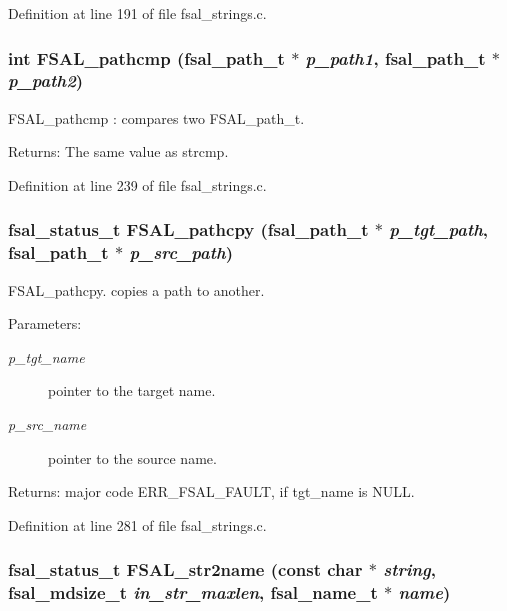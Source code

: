 Definition at line 191 of file fsal\_\-strings.c.
\subsubsection{\setlength{\rightskip}{0pt plus 5cm}int FSAL\_\-pathcmp (fsal\_\-path\_\-t $\ast$ {\em p\_\-path1}, fsal\_\-path\_\-t $\ast$ {\em p\_\-path2})}\label{group__FSALNameFunctions_ga5}


FSAL\_\-pathcmp : compares two FSAL\_\-path\_\-t.

\begin{Desc}
\item[Returns:]The same value as strcmp. \end{Desc}


Definition at line 239 of file fsal\_\-strings.c.
\subsubsection{\setlength{\rightskip}{0pt plus 5cm}fsal\_\-status\_\-t FSAL\_\-pathcpy (fsal\_\-path\_\-t $\ast$ {\em p\_\-tgt\_\-path}, fsal\_\-path\_\-t $\ast$ {\em p\_\-src\_\-path})}\label{group__FSALNameFunctions_ga7}


FSAL\_\-pathcpy. copies a path to another.

\begin{Desc}
\item[Parameters:]
\begin{description}
\item[{\em p\_\-tgt\_\-name}]pointer to the target name. \item[{\em p\_\-src\_\-name}]pointer to the source name. \end{description}
\end{Desc}
\begin{Desc}
\item[Returns:]major code ERR\_\-FSAL\_\-FAULT, if tgt\_\-name is NULL. \end{Desc}


Definition at line 281 of file fsal\_\-strings.c.
\subsubsection{\setlength{\rightskip}{0pt plus 5cm}fsal\_\-status\_\-t FSAL\_\-str2name (const char $\ast$ {\em string}, fsal\_\-mdsize\_\-t {\em in\_\-str\_\-maxlen}, fsal\_\-name\_\-t $\ast$ {\em name})}\label{group__FSALNameFunctions_ga0}


